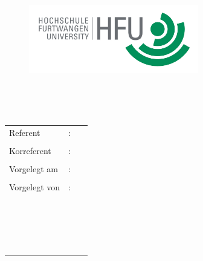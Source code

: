 \begin{titlepage}
\pagestyle{empty}

\begin{flushright}
\begin{figure}[ht]
\flushright
\includegraphics[height=3cm]{content/pictures/hfu.jpg}
\end{figure}
\end{flushright}

\begin{center}
{\fontsize{18}{22} \selectfont \docArtDerArbeit}\\[5mm]
\vspace{1cm}
\begin{onehalfspace}
{\fontsize{22}{26} \selectfont \textbf{\docTitle}}\\[5mm]
{\fontsize{18}{22} \selectfont \docUntertitle}


\end{onehalfspace}
\end{center}

\vfill
\begin{center}
\begin{tabular}{lcl}
Referent  		&:& \textsc{\docErsterReferent} 	\\ \\
Korreferent 		&:& \docZweiterReferent \\ \\	
Vorgelegt am 	&:& \docAbgabedatum 	\\ \\
Vorgelegt von 	&:& \textsc{\docVorname~\docNachname}\\
				& & \textsc{\docVornamea~\docNachnamea}\\
				& & \textsc{\docVornameb~\docNachnameb}\\
				& & \textsc{\docVornamec~\docNachnamec}\\
				& & \textsc{\docVornamed~\docNachnamed}\\			
\end{tabular}
\end{center}
\end{titlepage}